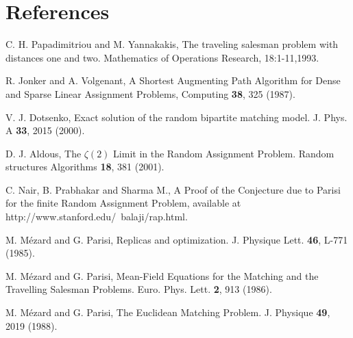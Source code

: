 \documentclass[]{iopart}
\begin{document}
\section*{References}
\begin{thebibliography}{99}
 {C. H. Papadimitriou and M. Yannakakis,
 The traveling salesman problem with distances one and two.
 {Mathematics of Operations Research}, 18:1-11,1993.}


 {R. Jonker  and  A. Volgenant,
  A Shortest Augmenting Path
      Algorithm for Dense and Sparse Linear  Assignment Problems,
 { Computing } {\bf 38}, 325 (1987).}



 { V. J. Dotsenko,
Exact solution of the random  bipartite matching model. 
{ J. Phys. A} {\bf 33}, 2015 (2000).}

 {D. J. Aldous,
The $\zeta(2)$ Limit in the Random Assignment Problem.
 Random structures Algorithms {\bf 18}, 381 (2001).}


{ C. Nair, B. Prabhakar and Sharma M.,  A Proof of the
 Conjecture due to Parisi for the finite Random Assignment Problem,
available at http://www.stanford.edu/~balaji/rap.html.}

{ M. M\'ezard and G. Parisi,
Replicas and optimization. 
{ J. Physique Lett.} {\bf 46}, L-771 (1985).}

{ M. M\'ezard and G. Parisi,
Mean-Field Equations for the Matching
 and the Travelling Salesman Problems.
 { Euro. Phys. Lett.} {\bf 2}, 913 (1986).}

{ M. M\'ezard and G. Parisi,
 The Euclidean Matching Problem.
 { J. Physique} {\bf 49}, 2019 (1988).}



\end{thebibliography}
\end{document}
